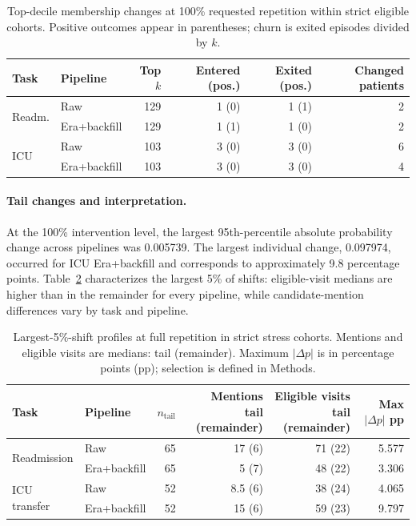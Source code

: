 \documentclass{article}
\begin{document}
\begin{table}[!htbp]
  \caption{Top-decile membership changes at 100\% requested repetition within
  strict eligible cohorts. Positive outcomes appear in parentheses; churn is
  exited episodes divided by $k$.}
  \label{tab:stress_churn}
  \centering
  \small
  \begin{tabular*}{\linewidth}{@{\extracolsep{\fill}}llrrrr@{}}
    \toprule
    Task & Pipeline & Top $k$ & Entered (pos.) & Exited (pos.) & Changed patients \\
    \midrule
    \multirow{2}{*}{Readm.}
      & Raw & 129 & 1 (0) & 1 (1) & 2 \\
      & Era+backfill & 129 & 1 (1) & 1 (0) & 2 \\
    \midrule
    \multirow{2}{*}{ICU}
      & Raw & 103 & 3 (0) & 3 (0) & 6 \\
      & Era+backfill & 103 & 3 (0) & 3 (0) & 4 \\
    \bottomrule
  \end{tabular*}
\end{table}

\paragraph{Tail changes and interpretation.}
At the 100\% intervention level, the largest 95th-percentile absolute
probability change across pipelines was 0.005739. The largest individual change,
0.097974, occurred for ICU Era+backfill and corresponds to approximately 9.8
percentage points. Table~\ref{tab:stress_shift_tail} characterizes the largest
5\% of shifts: eligible-visit medians are higher than in the remainder for
every pipeline, while candidate-mention differences vary by task and pipeline.

\begin{table}[!htbp]
  \caption{Largest-5\%-shift profiles at full repetition in strict stress
  cohorts. Mentions and eligible visits are medians: tail (remainder).
  Maximum $|\Delta p|$ is in percentage points (pp); selection is defined in Methods.}
  \label{tab:stress_shift_tail}
  \centering
  \footnotesize
  \begin{tabular*}{\linewidth}{@{\extracolsep{\fill}}llrrrr@{}}
    \toprule
    Task & Pipeline & $n_{\mathrm{tail}}$ & \shortstack{Mentions\\tail (remainder)}
      & \shortstack{Eligible visits\\tail (remainder)} & \shortstack{Max $|\Delta p|$\\pp} \\
    \midrule
    \multirow{2}{*}{Readmission}
      & Raw & 65 & 17 (6) & 71 (22) & 5.577 \\
      & Era+backfill & 65 & 5 (7) & 48 (22) & 3.306 \\
    \midrule
    \multirow{2}{*}{ICU transfer}
      & Raw & 52 & 8.5 (6) & 38 (24) & 4.065 \\
      & Era+backfill & 52 & 15 (6) & 59 (23) & 9.797 \\
    \bottomrule
  \end{tabular*}
\end{table}
\end{document}
